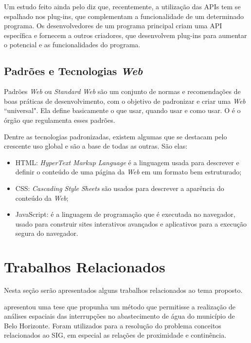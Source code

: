 \documentclass[12pt]{article}
\begin{document}
Um estudo feito ainda pelo \citeauthor{canaltechapi} diz que, recentemente, a utilização das APIs tem se espalhado nos plug-ins, que complementam a funcionalidade de um determinado programa. Os desenvolvedores de um programa principal criam uma API específica e fornecem a outros criadores, que desenvolvem plug-ins para aumentar o potencial e as funcionalidades do programa.

\subsection{Padrões e Tecnologias \emph{Web}}

Padrões \emph{Web} ou \emph{Standard Web} são um conjunto de normas e recomendações de boas práticas de desenvolvimento, com o objetivo de padronizar e criar uma \emph{Web} ``universal". Ela define basicamente o que usar, quando usar e como usar. O \citet{w3c} é o órgão que regulamenta esses padrões.

Dentre as tecnologias padronizadas, existem algumas que se destacam pelo crescente uso global e são a base de todas as outras. São elas:

\begin{itemize}
\item HTML: \emph{HyperText Markup Language} é a linguagem usada para descrever e definir o conteúdo de uma página da \emph{Web} em um formato bem estruturado;
\item CSS: \emph{Cascading Style Sheets} são usados para descrever a aparência do conteúdo da \emph{Web};
\item JavaScript: é a linguagem de programação que é executada no navegador, usado para construir sites interativos avançados e aplicativos para a execução segura do navegador.
\end{itemize}

\section{Trabalhos Relacionados}

Nesta seção serão apresentados alguns trabalhos relacionados ao tema proposto.

\citet{cancado} apresentou uma tese que propunha um método que permitisse a realização de análises espaciais das interrupções no abastecimento de água do município de Belo Horizonte. Foram utilizados para a resolução do problema conceitos relacionados ao SIG, em especial as relações de proximidade e continência.
\end{document}
